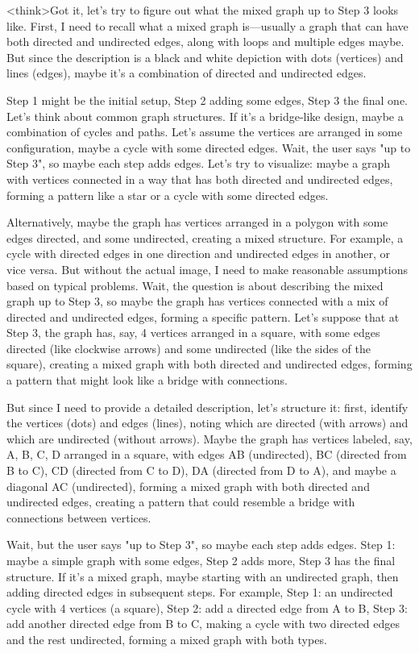 <think>Got it, let's try to figure out what the mixed graph up to Step 3 looks like. First, I need to recall what a mixed graph is—usually a graph that can have both directed and undirected edges, along with loops and multiple edges maybe. But since the description is a black and white depiction with dots (vertices) and lines (edges), maybe it's a combination of directed and undirected edges.

Step 1 might be the initial setup, Step 2 adding some edges, Step 3 the final one. Let's think about common graph structures. If it's a bridge-like design, maybe a combination of cycles and paths. Let's assume the vertices are arranged in some configuration, maybe a cycle with some directed edges. Wait, the user says "up to Step 3", so maybe each step adds edges. Let's try to visualize: maybe a graph with vertices connected in a way that has both directed and undirected edges, forming a pattern like a star or a cycle with some directed edges.

Alternatively, maybe the graph has vertices arranged in a polygon with some edges directed, and some undirected, creating a mixed structure. For example, a cycle with directed edges in one direction and undirected edges in another, or vice versa. But without the actual image, I need to make reasonable assumptions based on typical problems. Wait, the question is about describing the mixed graph up to Step 3, so maybe the graph has vertices connected with a mix of directed and undirected edges, forming a specific pattern. Let's suppose that at Step 3, the graph has, say, 4 vertices arranged in a square, with some edges directed (like clockwise arrows) and some undirected (like the sides of the square), creating a mixed graph with both directed and undirected edges, forming a pattern that might look like a bridge with connections.

But since I need to provide a detailed description, let's structure it: first, identify the vertices (dots) and edges (lines), noting which are directed (with arrows) and which are undirected (without arrows). Maybe the graph has vertices labeled, say, A, B, C, D arranged in a square, with edges AB (undirected), BC (directed from B to C), CD (directed from C to D), DA (directed from D to A), and maybe a diagonal AC (undirected), forming a mixed graph with both directed and undirected edges, creating a pattern that could resemble a bridge with connections between vertices.

Wait, but the user says "up to Step 3", so maybe each step adds edges. Step 1: maybe a simple graph with some edges, Step 2 adds more, Step 3 has the final structure. If it's a mixed graph, maybe starting with an undirected graph, then adding directed edges in subsequent steps. For example, Step 1: an undirected cycle with 4 vertices (a square), Step 2: add a directed edge from A to B, Step 3: add another directed edge from B to C, making a cycle with two directed edges and the rest undirected, forming a mixed graph with both types.

